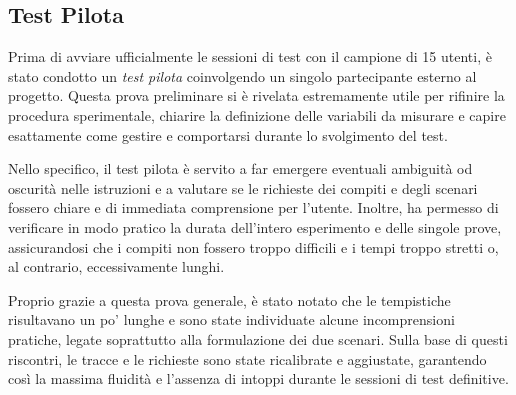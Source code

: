 \subsection{Test Pilota}
Prima di avviare ufficialmente le sessioni di test con il campione di 15 utenti, è stato condotto un \textit{test pilota} coinvolgendo un singolo partecipante esterno al progetto. Questa prova preliminare si è rivelata estremamente utile per rifinire la procedura sperimentale, chiarire la definizione delle variabili da misurare e capire esattamente come gestire e comportarsi durante lo svolgimento del test.

Nello specifico, il test pilota è servito a far emergere eventuali ambiguità od oscurità nelle istruzioni e a valutare se le richieste dei compiti e degli scenari fossero chiare e di immediata comprensione per l'utente. Inoltre, ha permesso di verificare in modo pratico la durata dell'intero esperimento e delle singole prove, assicurandosi che i compiti non fossero troppo difficili e i tempi troppo stretti o, al contrario, eccessivamente lunghi.

Proprio grazie a questa prova generale, è stato notato che le tempistiche risultavano un po' lunghe e sono state individuate alcune incomprensioni pratiche, legate soprattutto alla formulazione dei due scenari. Sulla base di questi riscontri, le tracce e le richieste sono state ricalibrate e aggiustate, garantendo così la massima fluidità e l'assenza di intoppi durante le sessioni di test definitive.